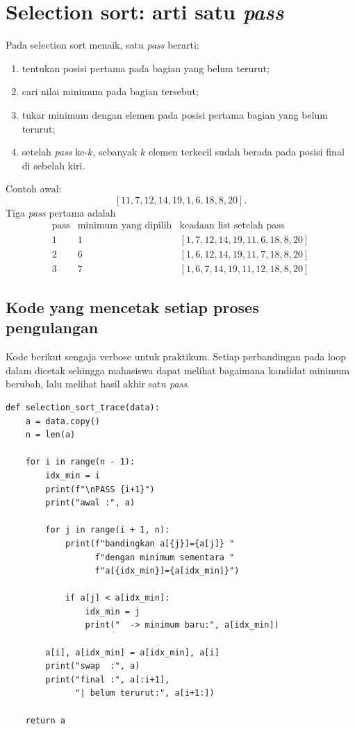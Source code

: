 \documentclass[11pt,a4paper]{report}
\begin{document}
\section{Selection sort: arti satu \textit{pass}}
Pada selection sort menaik, satu \textit{pass} berarti:
\begin{enumerate}
  \item tentukan posisi pertama pada bagian yang belum terurut;
  \item cari nilai minimum pada bagian tersebut;
  \item tukar minimum dengan elemen pada posisi pertama bagian yang belum terurut;
  \item setelah \textit{pass} ke-$k$, sebanyak $k$ elemen terkecil sudah berada pada posisi final di sebelah kiri.
\end{enumerate}

Contoh awal:
\[
[11,7,12,14,19,1,6,18,8,20].
\]
Tiga \textit{pass} pertama adalah
\[
\begin{array}{c|l|l}
\text{pass} & \text{minimum yang dipilih} & \text{keadaan list setelah pass}\\ \hline
1 & 1 & [1,7,12,14,19,11,6,18,8,20]\\
2 & 6 & [1,6,12,14,19,11,7,18,8,20]\\
3 & 7 & [1,6,7,14,19,11,12,18,8,20]
\end{array}
\]

\subsection{Kode yang mencetak setiap proses pengulangan}
Kode berikut sengaja verbose untuk praktikum. Setiap perbandingan pada loop dalam dicetak sehingga mahasiswa dapat melihat bagaimana kandidat minimum berubah, lalu melihat hasil akhir satu \textit{pass}.

\begin{lstlisting}
def selection_sort_trace(data):
    a = data.copy()
    n = len(a)

    for i in range(n - 1):
        idx_min = i
        print(f"\nPASS {i+1}")
        print("awal :", a)

        for j in range(i + 1, n):
            print(f"bandingkan a[{j}]={a[j]} "
                  f"dengan minimum sementara "
                  f"a[{idx_min}]={a[idx_min]}")

            if a[j] < a[idx_min]:
                idx_min = j
                print("  -> minimum baru:", a[idx_min])

        a[i], a[idx_min] = a[idx_min], a[i]
        print("swap  :", a)
        print("final :", a[:i+1],
              "| belum terurut:", a[i+1:])

    return a
\end{lstlisting}
\end{document}
